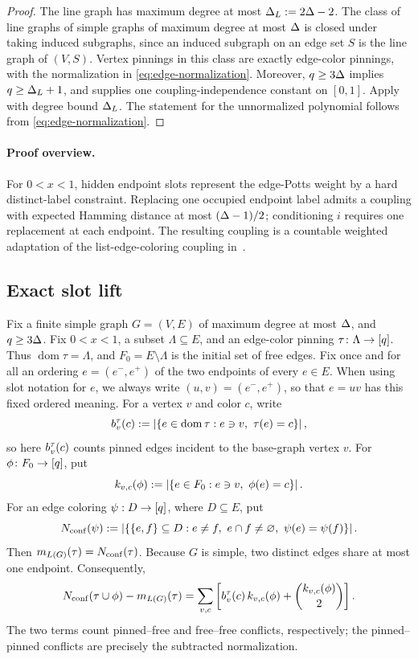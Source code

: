 \begin{proof}
The line graph has maximum degree at most
\(\Delta_L:=2\Delta-2\).  The class of line graphs of simple graphs of maximum
degree at most \(\Delta\) is closed under taking induced subgraphs, since an
induced subgraph on an edge set \(S\) is the line graph of \((V,S)\).
Vertex pinnings in this class are exactly edge-color pinnings, with the
normalization in \eqref{eq:edge-normalization}.
Moreover, \(q\ge3\Delta\) implies \(q\ge\Delta_L+1\), and
 supplies one coupling-independence constant on
\([0,1]\).  Apply
 with degree bound \(\Delta_L\).  The statement for
the unnormalized polynomial follows from \eqref{eq:edge-normalization}.
\end{proof}

\paragraph{Proof overview.}

For \(0<x<1\), hidden endpoint slots represent the edge-Potts weight by a
hard distinct-label constraint.  Replacing one occupied endpoint label
admits a coupling with expected Hamming distance at most \((\Delta-1)/2\);
conditioning \(i\) requires one replacement at each endpoint.  The resulting
coupling is a countable weighted adaptation of the list-edge-coloring
coupling in~\cite{CWZZ2025}.

\subsection{Exact slot lift}

Fix a finite simple graph \(G=(V,E)\) of maximum degree at most
\(\Delta\), and \(q\ge3\Delta\).  Fix \(0<x<1\), a subset
\(\Lambda\subseteq E\), and an edge-color pinning
\(\tau\colon\Lambda\to[q]\).  Thus
\(\operatorname{dom}\tau=\Lambda\), and
\(F_0=E\setminus\Lambda\) is the initial set of free edges.  Fix once and for all an
ordering \(e=(e^-,e^+)\) of the two endpoints of every \(e\in E\).  When
using slot notation for \(e\), we always write
\((u,v)=(e^-,e^+)\), so that \(e=uv\) has this fixed ordered meaning.
For a vertex
\(v\) and color \(c\), write
\[
  b_v^\tau(c)
  :=\left|\left\{e\in\operatorname{dom}\tau:e\ni v,\ \tau(e)=c\right\}\right|,
\]
so here $b_v^\tau(c)$ counts pinned edges incident to the base-graph
vertex $v$.  For \(\phi\colon F_0\to[q]\), put
\[
  k_{v,c}(\phi)
  :=\left|\left\{e\in F_0:e\ni v,\ \phi(e)=c\right\}\right|.
\]
For an edge coloring \(\psi:D\to[q]\), where \(D\subseteq E\), put
\[
  N_{\mathrm{conf}}(\psi)
  :=\left|\left\{\{e,f\}\subseteq D:
        e\ne f,\ e\cap f\ne\varnothing,\ \psi(e)=\psi(f)\right\}\right|.
\]
Then \(m_{L(G)}(\tau)=N_{\mathrm{conf}}(\tau)\).
Because \(G\) is simple, two distinct edges share at most one endpoint.
Consequently,
\begin{equation}\label{eq:edge-conflict-split}
  N_{\mathrm{conf}}(\tau\cup\phi)-m_{L(G)}(\tau)
  =
  \sum_{v,c}
  \left[
    b_v^\tau(c)\,k_{v,c}(\phi)
    +\binom{k_{v,c}(\phi)}2
  \right].
\end{equation}
The two terms count pinned--free and free--free conflicts, respectively;
the pinned--pinned conflicts are precisely the subtracted normalization.

